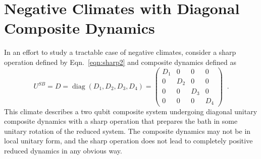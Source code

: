 \chapter{Negative Climates with Diagonal Composite Dynamics}
\label{sec:negclimate}

In an effort to study a tractable case of negative climates, consider a sharp operation defined by Eqn.\ \ref{eqn:sharp2} and composite dynamics defined as
$$
U^{SB} = D = \operatorname{diag}\left(D_1,D_2,D_3,D_4\right) = \begin{pmatrix}
D_1&0&0&0\\
0&D_2&0&0\\
0&0&D_3&0\\
0&0&0&D_4
\end{pmatrix}\;\;.
$$
This climate describes a two qubit composite system undergoing diagonal unitary composite dynamics with a sharp operation that prepares the bath in some unitary rotation of the reduced system.  The composite dynamics may not be in local unitary form, and the sharp operation does not lead to completely positive reduced dynamics in any obvious way.  

